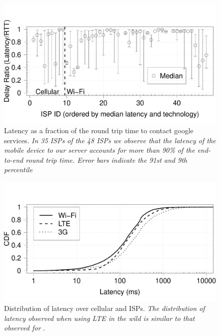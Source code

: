 \begin{figure}[t]
\includegraphics[width=\columnwidth]{plots/delay_ratio_isp_whisker.pdf}
\caption{Latency as a fraction of the round trip time to contact google services. \emph{In 35 ISPs of the 48 ISPs we observe that the latency of the mobile device to our server accounts for more than 90\% of the end-to-end round trip time. Error bars indicate the 91st and 9th percentile}}
\label{fig:compare-delay-ratio}
\end{figure}

\begin{figure}[t]
\includegraphics[width=\columnwidth]{plots/distrib_latency_technology.pdf}
\caption{Distribution of latency over cellular and \wifi ISPs. \emph{The distribution of latency observed when using LTE in the wild is similar to that observed for \wifi}.}
\label{fig:compare-delay-ratio}
\end{figure}


